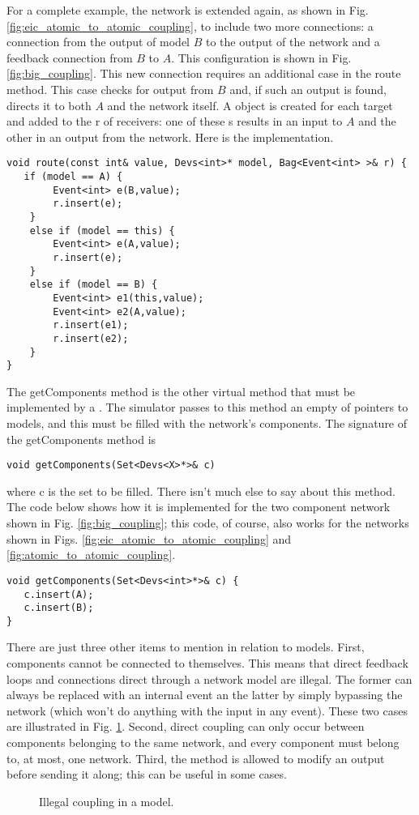 For a complete example, the network is extended again, as shown in Fig. \ref{fig:eic_atomic_to_atomic_coupling}, to include two more connections: a connection from the output of model $B$ to the output of the network and a feedback connection from $B$ to $A$. This configuration is shown in Fig. \ref{fig:big_coupling}. This new connection requires an additional case in the route method. This case checks for output from $B$ and, if such an output is found, directs it to both $A$ and the network itself. A  object is created for each target and added to the  r of receivers: one of these s results in an input to $A$ and the other in an output from the network. Here is the implementation.
\begin{verbatim}
void route(const int& value, Devs<int>* model, Bag<Event<int> >& r) {
   if (model == A) {
        Event<int> e(B,value);
        r.insert(e);
    }
    else if (model == this) {
        Event<int> e(A,value);
        r.insert(e);
    }
    else if (model == B) {
        Event<int> e1(this,value);
        Event<int> e2(A,value);
        r.insert(e1);
        r.insert(e2);
    }
}
\end{verbatim}

The getComponents method is the other virtual method that must be implemented by a . The simulator passes to this method an empty  of pointers to models, and this must be filled with the network's components. The signature of the getComponents method is
\begin{verbatim}
void getComponents(Set<Devs<X>*>& c) 
\end{verbatim}
where c is the set to be filled. There isn't much else to say about this method. The code below shows how it is implemented for the two component network shown in Fig. \ref{fig:big_coupling}; this code, of course, also works for the networks shown in Figs. \ref{fig:eic_atomic_to_atomic_coupling} and \ref{fig:atomic_to_atomic_coupling}.
\begin{verbatim}
void getComponents(Set<Devs<int>*>& c) { 
   c.insert(A);
   c.insert(B);
}
\end{verbatim}

There are just three other items to mention in relation to  models. First, components cannot be connected to themselves. This means that direct feedback loops and connections direct through a network model are illegal. The former can always be replaced with an internal event an the latter by simply bypassing the network (which won't do anything with the input in any event). These two cases are illustrated in Fig. \ref{fig:bad_coupling}. Second, direct coupling can only occur between components belonging to the same network, and every component must belong to, at most, one network. Third, the  method is allowed to modify an output before sending it along; this can be useful in some cases.
\begin{figure}[ht]
\centering
{}
\caption{Illegal coupling in a  model.}
\label{fig:bad_coupling}
\end{figure}

